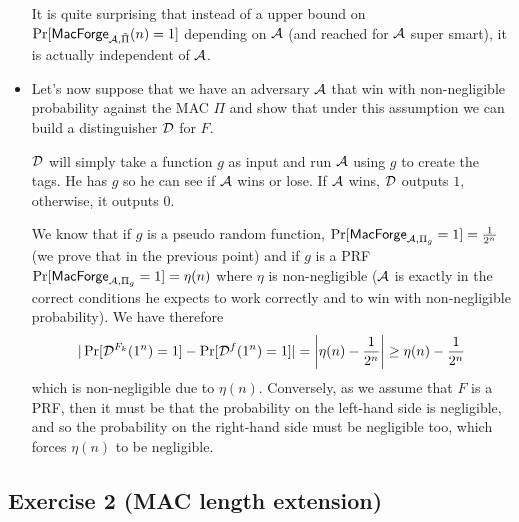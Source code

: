\begin{solution}
\begin{itemize}
      It is quite surprising that instead of a upper bound
      on $\Pr[\mathsf{MacForge}_{\mathcal{A}, \tilde{\Pi}}(n) = 1]$
      depending on $\mathcal{A}$ (and reached for $\mathcal{A}$ super smart),
      it is actually independent of $\mathcal{A}$.
    \item
      Let's now suppose that we have an adversary $\mathcal{A}$
      that win with non-negligible probability against the MAC $\Pi$
      and show that under this assumption we can build
      a distinguisher $\mathcal{D}$ for $F$.

      $\mathcal{D}$ will simply take a function $g$ as input
      and run $\mathcal{A}$ using $g$ to create the tags.
      He has $g$ so he can see if $\mathcal{A}$ wins or lose.
      If $\mathcal{A}$ wins, $\mathcal{D}$ outputs $1$, otherwise, it outputs $0$.

      We know that if $g$ is a pseudo random function,
      $\Pr[\mathsf{MacForge}_{\mathcal{A}, \Pi_g} = 1] = \frac{1}{2^n}$
      (we prove that in the previous point)
      and if $g$ is a PRF
      $\Pr[\mathsf{MacForge}_{\mathcal{A}, \Pi_g} = 1] = \eta(n)$
      where $\eta$ is non-negligible
      ($\mathcal{A}$ is exactly in the correct conditions he expects to work correctly and to win with non-negligible probability).
      We have therefore
      \[
        |\Pr[\mathcal{D}^{F_k}(1^n) = 1] - \Pr[\mathcal{D}^{f}(1^n) = 1]|
        = \left|\eta(n) - \frac{1}{2^n}\right| \ge \eta(n) - \frac{1}{2^n}
      \]
      which is non-negligible due to $\eta(n)$. Conversely, as we assume that $F$ is a PRF, then it must be that the probability on the left-hand side is negligible, and so the probability on the right-hand side must be negligible too, which forces $\eta(n)$ to be negligible.

  \end{itemize}

\end{solution}



\subsection{Exercise 2 (MAC length extension)}

